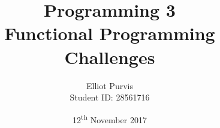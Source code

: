\begin{titlepage}
\title{Programming 3 \\ Functional Programming Challenges}
\author{Elliot Purvis \\ Student ID: 28561716}
\date{12\textsuperscript{th} November 2017}
\maketitle
\end{titlepage}